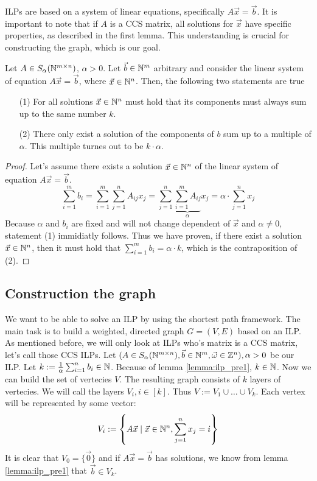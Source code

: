 ILPs are based on a system of linear equations, specifically $A \vec{x} = \vec{b}$. It is important to note that if $A$ is a CCS matrix, all solutions for $\vec{x}$ have specific properties, as described in the first lemma. This understanding is crucial for constructing the graph, which is our goal.

\begin{lemma}
    \label{lemma:ilp_pre1}
    Let $A\in S_\alpha(\mathbb{N}^{m \times n})$, $\alpha > 0$. Let $\vec b \in \mathbb{N}^m$ arbitrary and consider the linear system of equation $A\vec x=\vec b$, where $\vec x \in \mathbb{N}^n$. Then, the following two statements are true

    \begin{enumerate}
        \item[(1)] For all solutions $\vec x \in \mathbb{N}^n$ must hold that its components must always sum up to the same number $k$.
        \item[(2)] There only exist a solution of the components of $b$ sum up to a multiple of $\alpha$. This multiple turnes out to be $k \cdot \alpha$.
    \end{enumerate}
\end{lemma}

\begin{proof}
    Let's assume there exists a solution $\vec x \in \mathbb{N}^n$ of the linear system of equation $A\vec x=\vec b$.
    $$\sum_{i=1}^m b_i = \sum_{i=1}^{m}\sum_{j=1}^{n}A_{ij} x_j = \sum_{j=1}^{n}\underbrace{\sum_{i=1}^{m}A_{ij}}_\alpha x_j = \alpha \cdot \sum_{j=1}^{n}x_j$$
    Because $\alpha$ and $b_i$ are fixed and will not change dependent of $\vec x$ and $\alpha \neq 0$, statement (1) immidiatly follows. Thus we have proven, if there exist a solution $\vec x \in \mathbb{N}^n$, then it must hold that $\sum_{i=1}^{m}b_i = \alpha \cdot k$, which is the contraposition of (2).
\end{proof}


\subsection{Construction the graph}
\label{chap:graph_constrition}
We want to be able to solve an ILP by using the shortest path framework. The main task is to build a weighted, directed graph $G = (V, E)$ based on an ILP. As mentioned before, we will only look at ILPs who's matrix is a CCS matrix, let's call those CCS ILPs. Let $(A \in S_\alpha(\mathbb{N}^{m \times n}), \vec b \in \mathbb{N}^m, \vec\omega \in \mathbb{Z}^n), \alpha > 0$ be our ILP. Let $k := \frac{1}{\alpha} \sum_{i=1}^{n}b_i \in \mathbb{N}$. Because of lemma \ref{lemma:ilp_pre1}, $k \in \mathbb{N}$. Now we can build the set of vertecies $V$. The resulting graph consists of $k$ layers of vertecies. We will call the layers $V_i, i \in [k]$. Thus $V := V_1 \cup \dots \cup V_k$. Each vertex will be represented by some vector:
$$V_i := \left\{A\vec x \mid \vec x \in \mathbb{N}^n, \sum_{j=1}^{n} x_j = i \right\}$$ 
It is clear that $V_0 = \{\vec 0\}$ and if $A\vec x = \vec b$ has solutions, we know from lemma \ref{lemma:ilp_pre1} that $\vec b \in V_k$. 

